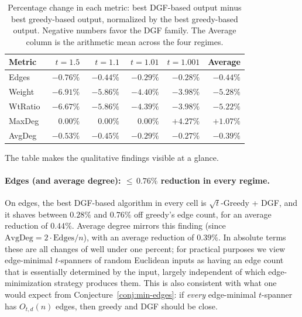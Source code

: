 \documentclass{article}
\begin{document}
\begin{table}[htbp]
    \centering
    \begin{tabular}{lrrrrr}
        \toprule
        Metric  & $t=1.5$ & $t=1.1$ & $t=1.01$ & $t=1.001$ & Average \\
        \midrule
        Edges   & $-0.76\%$           & $-0.44\%$           & $-0.29\%$           & $-0.28\%$ & $-0.44\%$ \\
        Weight  & $-6.91\%$           & $-5.86\%$           & $-4.40\%$           & $-3.98\%$ & $-5.28\%$ \\
        WtRatio & $-6.67\%$           & $-5.86\%$           & $-4.39\%$           & $-3.98\%$ & $-5.22\%$ \\
        MaxDeg  & $\phantom{+}0.00\%$ & $\phantom{+}0.00\%$ & $\phantom{+}0.00\%$ & $+4.27\%$ & $+1.07\%$ \\
        AvgDeg  & $-0.53\%$           & $-0.45\%$           & $-0.29\%$           & $-0.27\%$ & $-0.39\%$ \\
        \bottomrule
    \end{tabular}
    \caption{Percentage change in each metric: best DGF-based output
    minus best greedy-based output, normalized by the best
    greedy-based output. Negative numbers favor the DGF family. The
    Average column is the arithmetic mean across the four regimes.}
    \label{tab:summary-percent}
\end{table}

The table makes the qualitative findings visible at a glance.

\paragraph{Edges (and average degree): ${\le}\,0.76\%$ reduction in every regime.}
On edges, the best DGF-based algorithm in every cell is $\sqrt{t}$-Greedy
+ DGF, and it shaves between $0.28\%$ and $0.76\%$ off greedy's edge
count, for an average reduction of $0.44\%$. Average degree mirrors
this finding (since $\mathrm{AvgDeg} = 2\cdot \mathrm{Edges}/n$),
with an average reduction of $0.39\%$. In absolute terms these are
all changes of well under one percent; for practical purposes we
view edge-minimal $t$-spanners of random Euclidean inputs as having
an edge count that is essentially determined by the input, largely
independent of which edge-minimization strategy produces them. This
is also consistent with what one would expect from
Conjecture~\ref{conj:min-edges}: if \emph{every} edge-minimal
$t$-spanner has $O_{t,d}(n)$ edges, then greedy and DGF should be
close.
\end{document}

